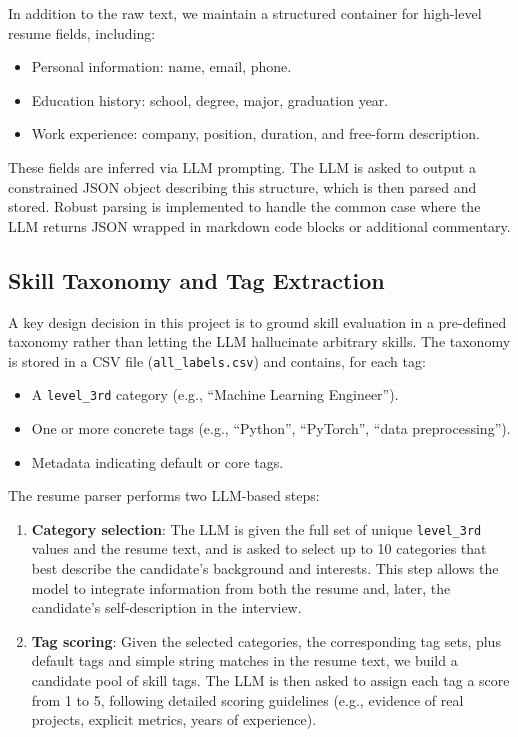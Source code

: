 \documentclass[11pt,a4paper]{article}
\begin{document}
In addition to the raw text, we maintain a structured container for high-level resume fields, including:

\begin{itemize}
    \item Personal information: name, email, phone.
    \item Education history: school, degree, major, graduation year.
    \item Work experience: company, position, duration, and free-form description.
\end{itemize}

These fields are inferred via LLM prompting. The LLM is asked to output a constrained JSON object describing this structure, which is then parsed and stored. Robust parsing is implemented to handle the common case where the LLM returns JSON wrapped in markdown code blocks or additional commentary.

\subsection{Skill Taxonomy and Tag Extraction}

A key design decision in this project is to ground skill evaluation in a pre-defined taxonomy rather than letting the LLM hallucinate arbitrary skills. The taxonomy is stored in a CSV file (\texttt{all\_labels.csv}) and contains, for each tag:

\begin{itemize}
    \item A \texttt{level\_3rd} category (e.g., ``Machine Learning Engineer'').
    \item One or more concrete tags (e.g., ``Python'', ``PyTorch'', ``data preprocessing'').
    \item Metadata indicating default or core tags.
\end{itemize}

The resume parser performs two LLM-based steps:

\begin{enumerate}
    \item \textbf{Category selection}: The LLM is given the full set of unique \texttt{level\_3rd} values and the resume text, and is asked to select up to 10 categories that best describe the candidate's background and interests. This step allows the model to integrate information from both the resume and, later, the candidate's self-description in the interview.
    \item \textbf{Tag scoring}: Given the selected categories, the corresponding tag sets, plus default tags and simple string matches in the resume text, we build a candidate pool of skill tags. The LLM is then asked to assign each tag a score from 1 to 5, following detailed scoring guidelines (e.g., evidence of real projects, explicit metrics, years of experience).
\end{enumerate}
\end{document}
